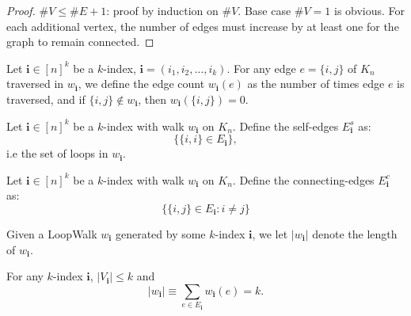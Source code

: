 \begin{proof}
  $\#V\le \#E+1$: proof by induction on $\#V$. Base case $\#V = 1$ is obvious.
  For each additional vertex, the number of edges must increase by at least one for the graph to remain connected.
\end{proof}


\begin{definition}
    \label{def:graph_edge_count}
    Let $\mathbf{i} \in[n]^k$ be a $k$-index, $\mathbf{i}=\left(i_1, i_2, \ldots, i_k\right)$.
    For any edge $e=\{i,j\}$ of $K_n$ traversed in $w_{\mathbf{i}}$, we define the edge count
    $w_{\mathbf{i}}(e)$ as the number of times edge $e$ is traversed, and if
    $\{i, j\} \notin w_{\mathbf{i}}$, then $w_{\mathbf{i}}(\{i, j\}) = 0$.
\end{definition}


\begin{definition}
    \label{def:graph_self_edges}
    Let $\mathbf{i} \in[n]^k$ be a $k$-index with walk $w_{\mathbf{i}}$ on $K_n$. Define the
    self-edges
    $E_{\mathbf{i}}^{s}$ as:
    $$
    \{\{i, i\} \in E_{\mathbf{i}}\},
    $$
    i.e the set of loops in $w_{\mathbf{i}}$.
\end{definition}


\begin{definition}
    \label{def:graph_connecting_edges}
    Let $\mathbf{i} \in[n]^k$ be a $k$-index with walk $w_{\mathbf{i}}$ on $K_n$. Define the
    connecting-edges $E_{\mathbf{i}}^{c}$ as:
    $$
    \{\{i, j\} \in E_{\mathbf{i}} : i \neq j\}
    $$
\end{definition}


\begin{definition}
  \label{def:length_of_w_i}
  Given a LoopWalk $w_\mathbf{i}$ generated by some $k$-index $\mathbf{i}$, we let $|w_\mathbf{i}|$
  denote the length of $w_\mathbf{i}$.
\end{definition}


\begin{lemma}[$|w_\mathbf{i}| = k$ : R-1-2 : lem:abs\_w\_i\_eq\_k]
  \label{lem:abs_w_i_eq_k}
  For any $k$-index $\mathbf{i}$, $|V_\mathbf{i}| \leq k$ and
  \[
  |w_\mathbf{i}| \equiv \sum_{e \in E_\mathbf{i}} w_\mathbf{i}(e) = k.
  \]
\end{lemma}

